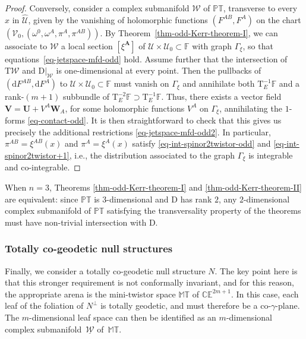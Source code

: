 \documentclass[10pt,a4paper]{amsart}
\numberwithin{equation}{section}
\newcommand{\mbf} [1]{\mathbf{#1}}
\newcommand{\mc} [1]{\mathcal{#1}}
\newcommand{\dd} {\mathrm{d}}
\newcommand{\Tgt} {\mathrm{T}}
\newcommand{\PT} {\mathbb{PT}}
\newcommand{\T} {\mathbb{T}}
\newcommand{\E} {\mathbb{E}}
\newcommand{\M} {\mathbb{M}}
\newcommand{\C} {\mathbb{C}}
\newcommand{\F} {\mathbb{F}}
\begin{document}
\begin{proof}
Conversely, consider a complex submanifold $\mc{W}$ of $\PT$, transverse to every $\hat{x}$ in $\widehat{\mc{U}}$, given by the vanishing of holomorphic functions $(F^{AB}, F^A)$ on the chart $(\mc{V}_0,(\omega^0, \omega^A, \pi^A, \pi^{AB}))$. By Theorem~\ref{thm-odd-Kerr-theorem-I}, we can associate to $\mc{W}$ a local section $[\xi^\mbf{A}]$ of $\mc{U} \times \mc{U}_0 \subset \F$ with graph $\Gamma_\xi$, so that equations~\eqref{eq-jetspace-mfd-odd} hold. Assume further that the intersection of $\Tgt \mc{W}$ and $\left. \mathrm{D} \right|_\mc{W}$ is one-dimensional at every point. Then the pullbacks of $( \dd F^{AB} , \dd F^{A} )$ to $\mc{U} \times \mc{U}_0 \subset \F$ must vanish on $\Gamma_\xi$ and annihilate both $\Tgt^{-1}_E \F$ and a rank-$(m+1)$ subbundle of $\Tgt^{-2}_E \F \supset \Tgt^{-1}_E \F$. Thus, there exists a vector f\/ield $\bm{V} = \bm{U} + V^A \bm{W}_A $, for some holomorphic functions $V^A$ on $\Gamma_\xi$, annihilating the $1$-forms \eqref{eq-contact-odd}. It is then straightforward to check that this gives us precisely the additional restrictions \eqref{eq-jetspace-mfd-odd2}. In particular, $\pi^{AB} = \xi^{AB}(x)$ and $\pi^{A} = \xi^A(x)$ satisfy \eqref{eq-int-spinor2twistor-odd} and \eqref{eq-int-spinor2twistor+1}, i.e., the distribution associated to the graph $\Gamma_{\xi}$ is integrable and co-integrable.
\end{proof}

\begin{Remark}\label{rem-fol-1}
When $n=3$, Theorems \ref{thm-odd-Kerr-theorem-I} and \ref{thm-odd-Kerr-theorem-II} are equivalent: since $\PT$ is $3$-dimensional and $\mathrm{D}$ has rank $2$, any $2$-dimensional complex submanifold of $\PT$ satisfying the transversality property of the theorems must have non-trivial intersection with $\mathrm{D}$.
\end{Remark}

\subsubsection{Totally co-geodetic null structures}
Finally, we consider a totally co-geodetic null structure $N$. The key point here is that this stronger requirement is not conformally invariant, and for this reason, the appropriate arena is the mini-twistor space $\M\T$ of $\C \E^{2m+1}$. In this case, each leaf of the foliation of $N^\perp$ is totally geodetic, and must therefore be a co-$\gamma$-plane. The $m$-dimensional leaf space can then be identif\/ied as an $m$-dimensional complex submanifold~$\underline{\mc{W}}$ of~$\M\T$.
\end{document}
